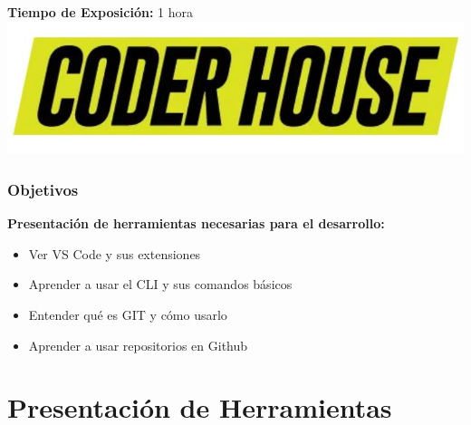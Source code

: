 \documentclass{beamer}
\begin{document}
\begin{frame}[plain]
\begin{center}
    		\vspace{.5cm}
    		\textbf{Tiempo de Exposición:}{ 1 hora}\\
    		\vspace{.2cm}
    		\includegraphics[scale=.15]{img/banner.JPG} 
    	\end{center}
    	

    
\end{frame}


\begin{frame}
	\frametitle{Objetivos}
		\textbf{Presentación de herramientas necesarias para el desarrollo: }
			\vspace{.3cm}
		\begin{itemize}
			\item Ver VS Code y sus extensiones
			\vspace{.3cm}
			\item Aprender a usar el CLI y sus comandos básicos
			\vspace{.3cm}
			\item Entender qué es GIT y cómo usarlo
			\vspace{.3cm}
			\item Aprender a usar repositorios en Github
			\vspace{.3cm}
		\end{itemize}
\end{frame}


\section{Presentación de Herramientas}
\end{document}
